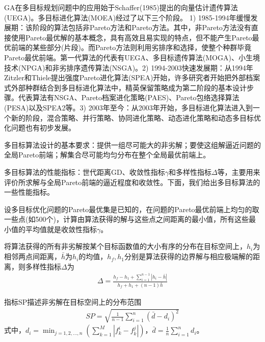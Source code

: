             \par
            GA在多目标规划问题中的应用始于Schaffer(1985)提出的向量估计遗传算法(UEGA)。多目标进化算法(MOEA)经过了以下三个阶段。
            1) 1985-1994年缓慢发展期：该阶段的算法包括非Pareto方法和Pareto方法。其中，非Pareto方法没有直接使用Pareto最优解的基本概念，具有高效且易实现的特点，但不能产生Pareto最优前端的某些部分(片段)。而Pareto方法则利用劣排序和选择，使整个种群毕竟Pareto最优前端。第一代算法的代表有UEGA、多目标遗传算法(MOGA)、小生境技术(NPGA)和非劣排序遗传算法(NSGA)。2) 1994-2003快速发展期：从1994年Zitzler和Thiele提出强度Pareto进化算法(SPEA)开始，许多研究者开始把外部档案式外部种群结合到多目标进化算法中，精英保留策略成为第二阶段的基本设计步骤。代表算法有NSGA、Pareto档案进化策略(PAES)、Pareto包络选择算法(PESA)以及SPEA2等。3) 2003年至今：从2003年开始，多目标进化算法进入到一个新的阶段，混合策略、并行策略、协同进化策略、动态进化策略和动态多目标优化问题也有初步发展。
            \par
            多目标算法设计的基本要求：提供一组尽可能大的非劣解；要使这组解逼近问题的全局Pareto前端；解集合尽可能均匀分布在整个全局最优前端上。
            \par
            多目标算法的性能指标：世代距离GD、收敛性指标$\gamma$和多样性指标$\Delta$等，主要用来评价所求解与全局Pareto前端的逼近程度和收敛性。下面，我们给出多目标算法的一些性能指标。
            \begin{definition}[收敛性指标]
            设多目标优化问题的Pareto最优集是已知的，在问题的Pareto最优前端上均匀的取一些点(如500个)，计算由算法获得的解与这些点之间距离的最小值，所有这些最小值的平均值就是收敛性指标$\gamma$。
            \end{definition}
            \begin{definition}[多样性指标]
            将算法获得的所有非劣解按某个目标函数值的大小有序的分布在目标空间上，$h_i$为相邻两点间距离，$\bar{h}$为$h_i$的均值，$h_f,h_1$分别是算法获得的边界解与相应极端解的距离，则多样性指标$\Delta$为
            \begin{align*}
            \Delta = \frac{h_f - h_1+\sum_{i=1}^{n-1}|h_i - \bar{h}|}{h_f+h_1+(n-1)\bar{h}}
            \end{align*}
            \end{definition}
            \begin{definition}[SP指标]
            指标SP描述非劣解在目标空间上的分布范围
            \begin{align*}
            SP = \sqrt{\frac{1}{n-1}\sum_{i=1}^n(\bar{d}-d_i)^2}
            \end{align*}
            式中，$d_i = \min_{j=1,2,\dots,n}\left( \sum_{k=1}^M|f_k^i - f_k^j| \right) $，$\bar{d} = \frac{1}{n}\sum_{i=1}^nd_i$。
            \end{definition}
